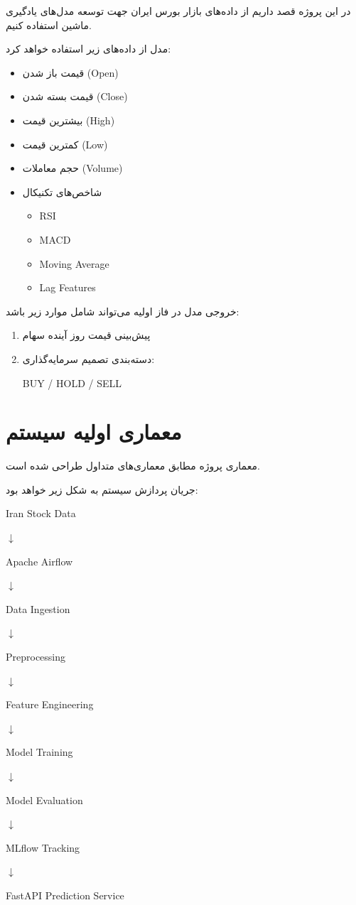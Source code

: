 \documentclass[12pt,a4paper]{article}
\begin{document}
در این پروژه قصد داریم از داده‌های بازار بورس ایران جهت توسعه مدل‌های یادگیری ماشین استفاده کنیم.

مدل از داده‌های زیر استفاده خواهد کرد:

\begin{itemize}
\item قیمت باز شدن (Open)
\item قیمت بسته شدن (Close)
\item بیشترین قیمت (High)
\item کمترین قیمت (Low)
\item حجم معاملات (Volume)
\item شاخص‌های تکنیکال
\begin{itemize}
\item RSI
\item MACD
\item Moving Average
\item Lag Features
\end{itemize}
\end{itemize}

خروجی مدل در فاز اولیه می‌تواند شامل موارد زیر باشد:

\begin{enumerate}
\item پیش‌بینی قیمت روز آینده سهام
\item دسته‌بندی تصمیم سرمایه‌گذاری:
\begin{center}
BUY / HOLD / SELL
\end{center}
\end{enumerate}


\section{معماری اولیه سیستم}

معماری پروژه مطابق معماری‌های متداول  طراحی شده است.

جریان پردازش سیستم به شکل زیر خواهد بود:

\begin{center}
Iran Stock Data

$\downarrow$

Apache Airflow

$\downarrow$

Data Ingestion

$\downarrow$

Preprocessing

$\downarrow$

Feature Engineering

$\downarrow$

Model Training

$\downarrow$

Model Evaluation

$\downarrow$

MLflow Tracking

$\downarrow$

FastAPI Prediction Service
\end{center}
\end{document}
